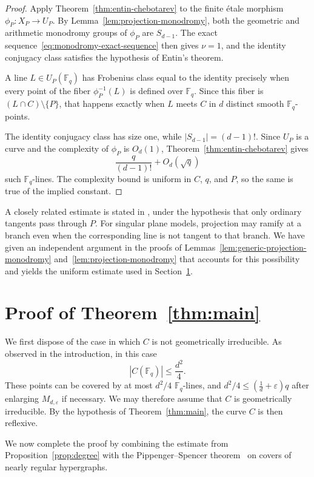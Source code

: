 \documentclass[12pt,reqno]{amsart}
\theoremstyle{definition}
\theoremstyle{remark}
\newcommand{\Fq}{\mathbb{F}_q}
\begin{document}
\begin{proof}
Apply Theorem~\ref{thm:entin-chebotarev} to the finite \'etale morphism
$\phi_P\colon X_P\to U_P$. By Lemma~\ref{lem:projection-monodromy}, both the geometric and arithmetic monodromy groups of $\phi_P$ are $S_{d-1}$. The exact sequence~\eqref{eq:monodromy-exact-sequence} then gives $\nu=1$, and the identity conjugacy class satisfies the hypothesis of Entin's theorem.

A line $L\in U_P(\Fq)$ has Frobenius class equal to the identity precisely when every point of the fiber $\phi_P^{-1}(L)$ is defined over $\Fq$. Since this fiber is $(L\cap C)\setminus\{P\}$, that happens exactly when $L$ meets $C$ in $d$ distinct smooth $\Fq$-points.

The identity conjugacy class has size one, while $|S_{d-1}|=(d-1)!$. Since $U_P$ is a curve and the complexity of $\phi_P$ is $O_d(1)$, Theorem~\ref{thm:entin-chebotarev} gives
\[
\frac{q}{(d-1)!}+O_d(\sqrt q)
\]
such $\Fq$-lines. The complexity bound is uniform in $C$, $q$, and $P$, so the same is true of the implied constant.
\end{proof}

A closely related estimate is stated in
\cite[Proposition~10]{Die12}, under the hypothesis that only
ordinary tangents pass through $P$. For singular plane models, projection may ramify at a branch even when the corresponding line is not tangent to that branch. We have given an independent argument in the proofs of
Lemmas~\ref{lem:generic-projection-monodromy} and~\ref{lem:projection-monodromy} that accounts for this
possibility and yields the uniform estimate used in
Section~\ref{sec:main-thm}.

\section{Proof of Theorem~\ref{thm:main}}\label{sec:main-thm}

We first dispose of the case in which $C$ is not geometrically irreducible. As observed in the introduction, in this case
\[
|C(\Fq)|\leq \frac{d^2}{4}.
\]
These points can be covered by at most $d^2/4$ $\Fq$-lines, and $d^2/4 \le \left(\frac{1}{d}+\varepsilon\right)q$ after enlarging $M_{d,\varepsilon}$ if necessary. We may therefore assume that $C$ is geometrically irreducible. By the hypothesis of Theorem~\ref{thm:main}, the curve $C$ is then reflexive.

We now complete the proof by combining the estimate from Proposition~\ref{prop:degree} with the Pippenger--Spencer theorem~\cite{PS89} on covers of nearly regular hypergraphs.
\end{document}
